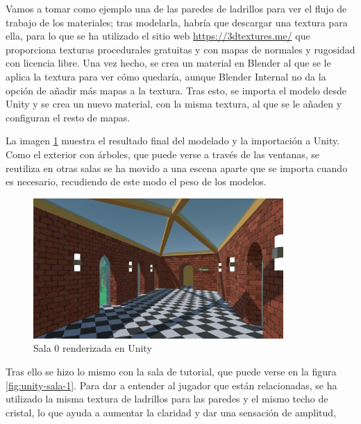 Vamos a tomar como ejemplo una de las paredes de ladrillos para ver el flujo de trabajo de los materiales; tras modelarla, habría que descargar una textura para ella, para lo que se ha utilizado el sitio web \url{https://3dtextures.me/} que proporciona texturas procedurales gratuitas y con mapas de normales y rugosidad con licencia libre. Una vez hecho, se crea un material en Blender al que se le aplica la textura para ver cómo quedaría, aunque Blender Internal no da la opción de añadir más mapas a la textura. Tras esto, se importa el modelo desde Unity y se crea un nuevo material, con la misma textura, al que se le añaden y configuran el resto de mapas.

La imagen \ref{fig:unity-sala-0} muestra el resultado final del modelado y la importación a Unity. Como el exterior con árboles, que puede verse a través de las ventanas, se reutiliza en otras salas se ha movido a una escena aparte que se importa cuando es necesario, recudiendo de este modo el peso de los modelos.

\begin{figure}[!h]
\begin{center}
\includegraphics[width=0.85\textwidth]{imagenes/7/salas-unity/unity-sala-0.png}
\caption{Sala 0 renderizada en Unity}
\label{fig:unity-sala-0}
\end{center}
\end{figure}

Tras ello se hizo lo mismo con la sala de tutorial, que puede verse en la figura \ref{fig:unity-sala-1}. Para dar a entender al jugador que están relacionadas, se ha utilizado la misma textura de ladrillos para las paredes y el mismo techo de cristal, lo que ayuda a aumentar la claridad y dar una sensación de amplitud,

